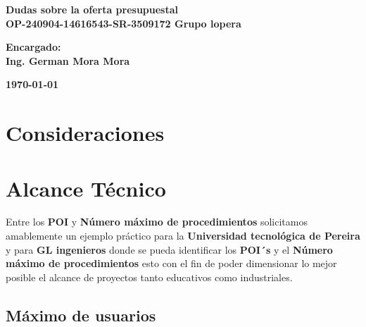 \documentclass{article}
\begin{document}
\begin{titlepage}
    \begin{center}
        
        
    \end{center}
    \vspace{15mm}
    
    \begin{center}
        {\LARGE{\bf Dudas sobre la oferta presupuestal}}\\
        
        \LARGE{\textbf{OP-240904-14616543-SR-3509172 Grupo lopera}}
    \end{center}
    
    \vspace{40mm}
    \par
    
    \noindent
    \begin{minipage}[]{1\textwidth}
    \centering
        \large{
            \bf Encargado: \\ %
            Ing. German Mora Mora 
        }
    \end{minipage}
    \hfill
    
    
    \vspace{40mm}
    
    \begin{center}{
        \large{\bf\today}
        }
    \end{center}
\end{titlepage}
   
   
\section*{Consideraciones}


\section*{Alcance Técnico}

Entre los \textbf{POI} y \textbf{Número máximo de procedimientos} solicitamos amablemente un ejemplo práctico para la \textbf{Universidad tecnológica de Pereira} y para \textbf{GL ingenieros} donde se pueda identificar los \textbf{POI´s} y el \textbf{Número máximo de procedimientos} esto con el fin de poder dimensionar lo mejor posible el alcance de proyectos tanto educativos como industriales.

\subsection*{\textbf{Máximo de usuarios}}
\end{document}
